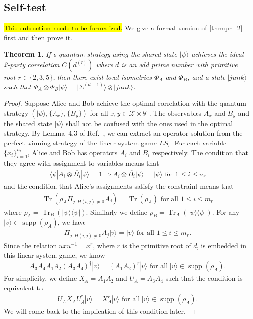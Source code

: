 \documentclass[11pt,letterpaper]{article}
\newcommand{\ket}[1]{|#1\rangle}
\newcommand{\bra}[1]{\langle#1|}
\newcommand{\ketbra}[2]{|#1\rangle\langle#2|}
\newcommand{\x}{\otimes}
\DeclareMathOperator{\Tr}{Tr}
\DeclareMathOperator{\supp}{supp}
\newcommand{\calX}{\mathcal{X}}
\newcommand{\calY}{\mathcal{Y}}
\newcommand{\1}{\mathbb{1}}
\newcommand{\EPR}[1]{\Sigma^{(#1)}}
\newcommand{\LS}{LS}
\newcommand{\dr}[1]{d^{(#1)}}
\newtheorem{theorem}{Theorem}
\theoremstyle{definition}
\begin{document}
\subsection{Self-test}
\hl{This subsection needs to be formalized.}
We give a formal version of \cref{thm:pr_2} first and then prove it.
\begin{theorem}
\label{thm:selftest}
	If a quantum strategy using the shared state $\ket{\psi}$ achieves the ideal 2-party correlation $C(\dr{r})$ where $d$ is an odd
	prime number with primitive root $r \in \{2,3,5\}$, then there exist local isometries $\Phi_A$ and $\Phi_B$, and a state $\ket{junk}$ such 
	that $\Phi_A\x\Phi_B \ket{\psi} = \ket{\EPR{d-1}} \x \ket{junk}$.
\end{theorem}
\begin{proof}
Suppose Alice and Bob achieve the optimal correlation with the quantum strategy $(\ket{\psi}, \{A_x\}, \{B_y\})$
for all $x,y \in \calX \times \calY$ .
The observables $A_x$ and $B_y$ and the shared state $\ket{\psi}$ shall not be confused with the ones used in the optimal strategy.
By Lemma~$4.3$ of Ref.~\cite{coladan2017}, we can extract an operator solution from the perfect winning strategy 
of the linear system game $\LS_r$. 
For each variable $\{ x_i \}_{i=1}^{n_r}$, Alice and Bob has operators $A_i$ and $B_i$ respectively.
The condition that they agree with assignment to variables means that 
\begin{align}
	\bra{\psi} A_i \otimes \overline{B_i} \ket{\psi} = 1 \Rightarrow A_i \otimes \overline{B_i} \ket{\psi} = \ket{\psi}
	\text{ for } 1 \leq i \leq n_r
\end{align}
and the condition that Alice's assignments satisfy the constraint means that 
\begin{align}
	\Tr(\rho_A \Pi_{j: H(i,j) \neq 0} A_j) = \Tr(\rho_A) \text{ for all } 1 \leq i \leq m_r
\end{align}
where $\rho_A =  \Tr_B(\ketbra{\psi}{\psi})$. 
Similarly we define $\rho_B = \Tr_A(\ketbra{\psi}{\psi})$.
For any $\ket{v} \in \supp(\rho_A)$,
we have 
\begin{align}
\Pi_{j:H(i,j) \neq 0} A_j \ket{v} = \ket{v} \text{ for all } 1 \leq i \leq m_r.
\end{align}
Since the relation $uxu^{-1} = x^r$, where $r$ is the primitive root of $d$, is embedded in this linear system game, we know
\begin{align}
	A_3A_4 A_1A_2 (A_3A_4)^\dagger \ket{v}= (A_1A_2)^r \ket{v} \text{ for all } \ket{v} \in \supp(\rho_A).
\end{align}
For simplicity, we define $X_A = A_1A_2$ and $U_A=A_3A_4$ such that
the condition is equivalent to
\begin{align}
	\label{eq:ux_relation}
	U_AX_AU_A^\dagger \ket{v} = X_A^r \ket{v} \text{ for all } \ket{v} \in \supp(\rho_A).
\end{align}
We will come back to the implication of this condition later.


\end{proof}
\end{document}
